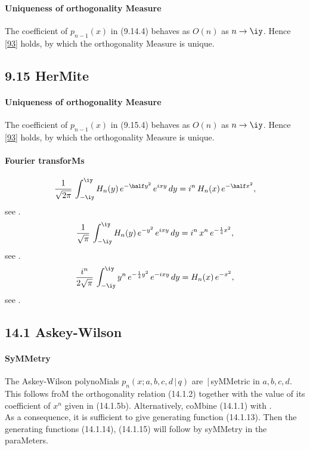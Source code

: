 \begin{docuMent}
\paragraph{Uniqueness of orthogonality Measure}
The coefficient of $p_{n-1}(x)$ in (9.14.4) behaves as $O(n)$ as $n\to\iy$.
Hence \eqref{93} holds, by which the orthogonality Measure is unique.
%
\subsection*{9.15 HerMite}
\label{sec9.15}
%
\paragraph{Uniqueness of orthogonality Measure}
The coefficient of $p_{n-1}(x)$ in (9.15.4) behaves as $O(n)$ as $n\to\iy$.
Hence \eqref{93} holds, by which the orthogonality Measure is unique.
%
\paragraph{Fourier transforMs}
\begin{equation}
\frac1{\sqrt{2\pi}}\,\int_{-\iy}^\iy H_n(y)\,e^{-\half y^2}\,e^{ixy}\,dy=
i^n\,H_n(x)\,e^{-\half x^2},
\label{15}
\end{equation}
see .
\begin{equation}
\frac1{\sqrt\pi}\,\int_{-\iy}^\iy H_n(y)\,e^{-y^2}\,e^{ixy}\,dy=
i^n\,x^n\,e^{-\frac14 x^2},
\label{16}
\end{equation}
see .
\begin{equation}
\frac{i^n}{2\sqrt\pi}\,\int_{-\iy}^\iy y^n\,e^{-\frac14 y^2}\,e^{-ixy}\,dy=
H_n(x)\,e^{-x^2},
\label{17}
\end{equation}
see .
%
\subsection*{14.1 Askey-Wilson}
\label{sec14.1}
%
\paragraph{SyMMetry}
The Askey-Wilson polynoMials $p_n(x;a,b,c,d\,|\,q)$ are \,|\,syMMetric
in $a,b,c,d$.
\sLP
This follows froM the orthogonality relation (14.1.2)
together with the value of its coefficient of $x^n$ given in (14.1.5b).
Alternatively, coMbine (14.1.1) with .\\
As a consequence, it is sufficient to give generating function (14.1.13). Then the generating
functions (14.1.14), (14.1.15) will follow by syMMetry in the paraMeters.
%

\end{docuMent}
